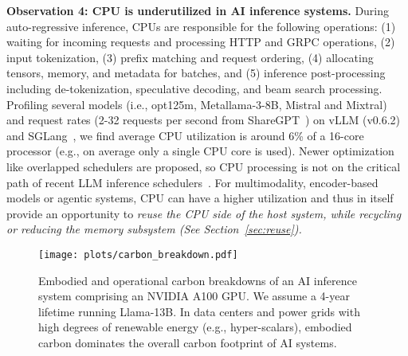 \textbf{Observation 4: CPU is underutilized in AI inference systems.} During auto-regressive inference, CPUs are responsible for the following operations: (1) waiting for incoming requests and processing HTTP and GRPC operations, (2) input tokenization, (3) prefix matching and request ordering, (4) allocating tensors, memory, and metadata for batches, and (5) inference post-processing including de-tokenization, speculative decoding, and beam search processing.
Profiling several models (i.e., opt125m, Metallama-3-8B, Mistral and Mixtral) and request rates (2-32 requests per second from ShareGPT~\cite{sharegpt}) on vLLM (v0.6.2) and SGLang~\cite{zheng2023efficiently}, we find average CPU utilization is around 6\% of a 16-core processor (e.g., on average only a single CPU core is used).
Newer optimization like overlapped schedulers are proposed, so CPU processing is not on the critical path of recent LLM inference schedulers~\cite{vllm2024perfupdate}. For multimodality, encoder-based models or agentic systems, CPU can have a higher utilization and thus  in itself provide an opportunity to \textit{reuse the CPU side of the host system, while \textit{recycling} or \textit{reducing} the memory subsystem (See Section~\ref{sec:reuse}).} 

\begin{figure}[t]
    \texttt{[image: plots/carbon\_breakdown.pdf]}
    \vspace{-1.5em}
    \caption{Embodied and operational carbon breakdowns of an AI inference system comprising an NVIDIA A100 GPU. We assume a 4-year lifetime running Llama-13B. In data centers and power grids with high degrees of renewable energy (e.g., hyper-scalars), embodied carbon dominates the overall carbon footprint of AI systems.}
    \label{fig:cf}
    \vspace{-1em}
\end{figure}
